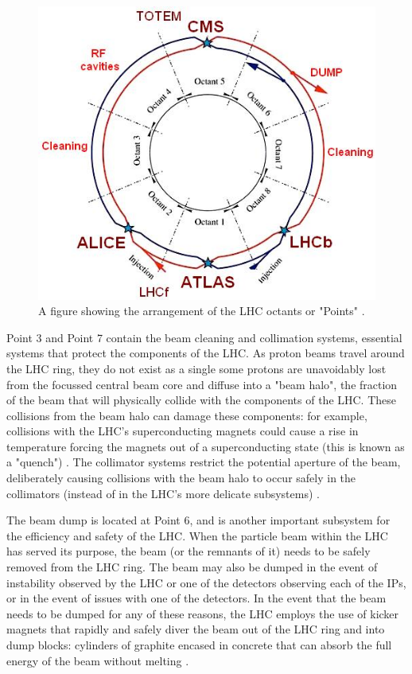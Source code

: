 \documentclass[12pt,a4paper,epsf,portrait,times,epsfig]{article}
\begin{document}
		\begin{figure}
			\centering
			\includegraphics[scale=0.5]{LHC_Octants}
			\caption{A figure showing the arrangement of the LHC octants or "Points" \cite{Evans_2008}.}
			\label{Fig:CERNOctants}
		\end{figure}

		Point 3 and Point 7 contain the beam cleaning and collimation systems, essential systems that protect the components of the LHC. As proton beams travel around the LHC ring, they do not exist as a single some protons are unavoidably lost from the focussed central beam core and diffuse into a "beam halo", the fraction of the beam that will physically collide with the components of the LHC. These collisions from the beam halo can damage these components: for example, collisions with the LHC's superconducting magnets could cause a rise in temperature forcing the magnets out of a superconducting state (this is known as a "quench") \cite{LHCCollimation1}. The collimator systems restrict the potential aperture of the beam, deliberately causing collisions with the beam halo to occur safely in the collimators (instead of in the LHC's more delicate subsystems) \cite{LHCCollimation2}. \par 

		The beam dump is located at Point 6, and is another important subsystem for the efficiency and safety of the LHC. When the particle beam within the LHC has served its purpose, the beam (or the remnants of it) needs to be safely removed from the LHC ring. The beam may also be dumped in the event of instability observed by the LHC or one of the detectors observing each of the IPs, or in the event of issues with one of the detectors. In the event that the beam needs to be dumped for any of these reasons, the LHC employs the use of kicker magnets that rapidly and safely diver the beam out of the LHC ring and into dump blocks: cylinders of graphite encased in concrete that can absorb the full energy of the beam without melting \cite{LHCDesignV2}. \par 
		
\end{document}

